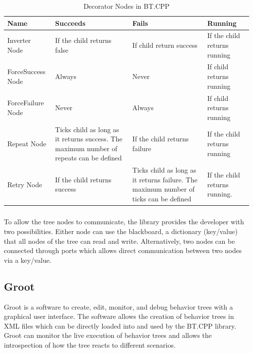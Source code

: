 \begin{center}
\begin{table}[ht]
	\caption{Decorator Nodes in BT.CPP}
	\label{tab:decorators_bt}
	\begin{tabular}{ | m{} | m{}| m{} | m{} |} 
  	\hline
  	Name & Succeeds & Fails & Running \\ 
  	\hline
  	Inverter Node & If the child returns false & If child return success &  If the child returns running \\ 
  	\hline
  	ForceSuccess Node & Always & Never & If child returns running \\ 
  	\hline
  	ForceFailure Node & Never & Always & If child returns running\\
  	\hline
  	Repeat Node & Ticks child as long as it returns success. The maximum number of repeats can be defined & If the child returns failure & If the child returns running \\
  	\hline  	
  	Retry Node & If the child returns success & Ticks child as long as it returns failure. The maximum number of ticks can be defined & If the child returns running. \\
  	\hline
	\end{tabular}
\end{table}
\end{center}

\subparagraph*{}
To allow the tree nodes to communicate, the library provides the developer with two possibilities. Either node can use the blackboard, a dictionary (key/value) that all nodes of the tree can read and write. Alternatively, two nodes can be connected through ports which allows direct communication between two nodes via a key/value.

\subsection{Groot}

Groot is a software to create, edit, monitor, and debug behavior trees with a graphical user interface. The software allows the creation of behavior trees in XML files which can be directly loaded into and used by the BT.CPP library. Groot can monitor the live execution of behavior trees and allows the introspection of how the tree reacts to different scenarios.


